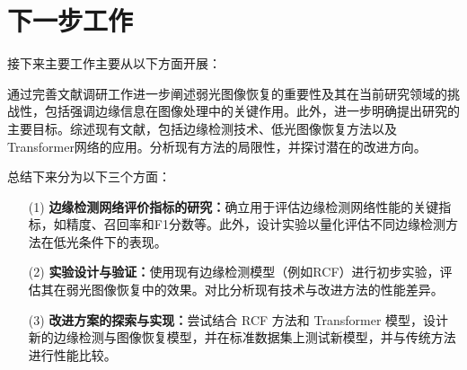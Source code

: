 \documentclass[a4paper]{ctexart}
\begin{document}
	\begin{table}[!htbp]
		\centering
		\tiny
		\caption{
			\label{tab: Ablation Study}
			Transformer分支和Transformer预训练权重尺寸和SCConv对模型的影响。
		} 
	\end{table}
	
	\section{下一步工作}
	
	接下来主要工作主要从以下方面开展：
	
	通过完善文献调研工作进一步阐述弱光图像恢复的重要性及其在当前研究领域的挑战性，包括强调边缘信息在图像处理中的关键作用。此外，进一步明确提出研究的主要目标。综述现有文献，包括边缘检测技术、低光图像恢复方法以及Transformer网络的应用。分析现有方法的局限性，并探讨潜在的改进方向。
	
	总结下来分为以下三个方面：
	\begin{itemize}
		\item[(1)] \textbf{边缘检测网络评价指标的研究：}确立用于评估边缘检测网络性能的关键指标，如精度、召回率和F1分数等。此外，设计实验以量化评估不同边缘检测方法在低光条件下的表现。
		
		\item[(2)] \textbf{实验设计与验证：}使用现有边缘检测模型（例如RCF）进行初步实验，评估其在弱光图像恢复中的效果。对比分析现有技术与改进方法的性能差异。
		
		\item[(3)] \textbf{改进方案的探索与实现：}尝试结合 RCF 方法和 Transformer 模型，设计新的边缘检测与图像恢复模型，并在标准数据集上测试新模型，并与传统方法进行性能比较。
	\end{itemize}
	
\end{document}
